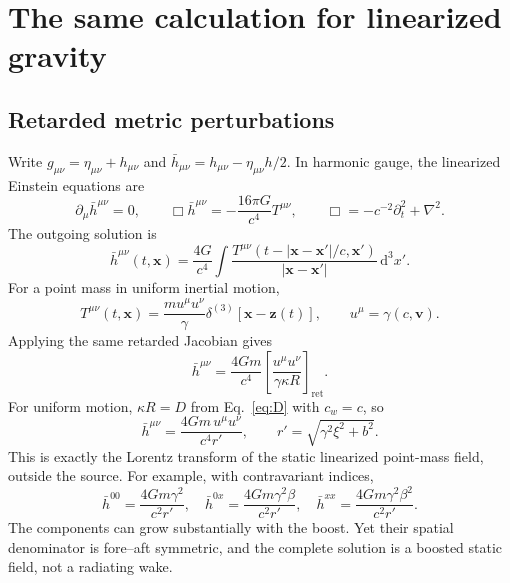 \documentclass[11pt,a4paper]{article}
\numberwithin{equation}{section}
\newcommand{\dd}{\mathrm{d}}
\newcommand{\ret}{\mathrm{ret}}
\begin{document}
\section{The same calculation for linearized gravity}
\label{sec:gravity}

\subsection{Retarded metric perturbations}

Write $g_{\mu\nu}=\eta_{\mu\nu}+h_{\mu\nu}$ and
$\bar h_{\mu\nu}=h_{\mu\nu}-\eta_{\mu\nu}h/2$. In harmonic gauge, the linearized Einstein equations are~\cite{carroll}
\begin{equation}
 \partial_\mu\bar h^{\mu\nu}=0,\qquad
 \Box\bar h^{\mu\nu}=-\frac{16\pi G}{c^4}T^{\mu\nu},
 \qquad \Box=-c^{-2}\partial_t^2+\nabla^2.
 \label{eq:linear-gr}
\end{equation}
The outgoing solution is
\begin{equation}
 \bar h^{\mu\nu}(t,\bm x)=\frac{4G}{c^4}
 \int\frac{T^{\mu\nu}(t-|\bm x-\bm x'|/c,\bm x')}
 {|\bm x-\bm x'|}\,\dd^3x'.
 \label{eq:ret-gr}
\end{equation}
For a point mass in uniform inertial motion,
\begin{equation}
 T^{\mu\nu}(t,\bm x)=\frac{m u^\mu u^\nu}{\gamma}
 \delta^{(3)}[\bm x-\bm z(t)],
 \qquad u^\mu=\gamma(c,\bm v).
 \label{eq:T-point}
\end{equation}
Applying the same retarded Jacobian gives
\begin{equation}
 \bar h^{\mu\nu}=\frac{4Gm}{c^4}
 \left[\frac{u^\mu u^\nu}{\gamma\kappa R}\right]_{\ret}.
 \label{eq:gr-lw}
\end{equation}
For uniform motion, $\kappa R=D$ from Eq.~\eqref{eq:D} with $c_w=c$, so
\begin{equation}
 \boxed{\bar h^{\mu\nu}=
 \frac{4Gm\,u^\mu u^\nu}{c^4 r'},\qquad
 r'=\sqrt{\gamma^2\xi^2+b^2}.}
 \label{eq:boosted-gr}
\end{equation}
This is exactly the Lorentz transform of the static linearized point-mass field, outside the source. For example, with contravariant indices,
\begin{equation}
 \bar h^{00}=\frac{4Gm\gamma^2}{c^2r'},\quad
 \bar h^{0x}=\frac{4Gm\gamma^2\beta}{c^2r'},\quad
 \bar h^{xx}=\frac{4Gm\gamma^2\beta^2}{c^2r'}.
 \label{eq:metric-components}
\end{equation}
The components can grow substantially with the boost. Yet their spatial denominator is fore--aft symmetric, and the complete solution is a boosted static field, not a radiating wake.
\end{document}
